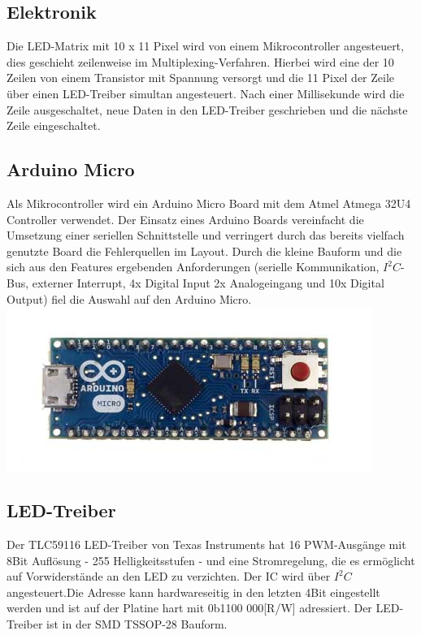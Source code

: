 \begin{multicols}{2}
\section{Elektronik}
\label{sec:Elektronik}
Die LED-Matrix mit 10 x 11 Pixel wird von einem Mikrocontroller angesteuert, dies geschieht zeilenweise im Multiplexing-Verfahren. Hierbei wird eine der 10  Zeilen von einem Transistor mit Spannung versorgt und die 11 Pixel der Zeile über einen LED-Treiber simultan angesteuert. Nach einer Millisekunde wird die Zeile ausgeschaltet, neue Daten in den LED-Treiber geschrieben und die nächste Zeile eingeschaltet. 
\subsection{Arduino Micro}
Als Mikrocontroller wird ein Arduino Micro Board mit dem Atmel Atmega 32U4 Controller verwendet. Der Einsatz eines Arduino Boards vereinfacht die Umsetzung einer seriellen Schnittstelle und verringert durch das bereits vielfach genutzte Board die Fehlerquellen im Layout. Durch die kleine Bauform und die sich aus den Features ergebenden Anforderungen (serielle Kommunikation, $I^{2}C$-Bus, externer Interrupt, 4x Digital Input 2x Analogeingang und 10x Digital Output) fiel die Auswahl auf den Arduino Micro.
\includegraphics[width=\columnwidth]{Abbildungen/ArduinoMicro}
\subsection{LED-Treiber}
Der TLC59116 LED-Treiber von Texas Instruments hat 16 PWM-Ausgänge mit 8Bit Auflösung - 255 Helligkeitsstufen - und eine Stromregelung, die es ermöglicht auf Vorwiderstände an den LED zu verzichten. Der IC wird über $I^{2}C$ angesteuert.Die Adresse kann hardwareseitig in den letzten 4Bit eingestellt werden und ist auf der Platine hart mit 0b1100 000[R/W] adressiert. Der LED-Treiber ist in der SMD TSSOP-28 Bauform.

\end{multicols}
